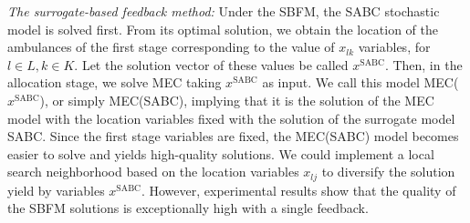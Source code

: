 \textit{The surrogate-based feedback method:} Under the SBFM,
the SABC stochastic model is solved first.
From its optimal solution, we obtain the location of the ambulances of the first stage corresponding to the value of $x_{lk}$ variables, for $l\in L, k \in K$. Let the solution vector of these values be called $x^\text{SABC}$. 
Then, in the allocation stage, we solve MEC 
taking $x^\text{SABC}$ as input. We call this
model MEC($x^\text{SABC}$), or simply MEC(SABC), implying
that it is the solution of the MEC model with the location variables fixed with the solution of the surrogate model SABC.
Since the first stage variables are fixed, the MEC(SABC) model becomes easier to solve and yields high-quality solutions. We could implement a local search neighborhood based on the location variables $x_{lj}$ to diversify the solution yield by variables $x^\text{SABC}$. However, experimental results show that the quality of the SBFM solutions is exceptionally high with a single feedback.  


